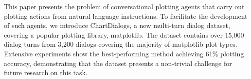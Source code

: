 This paper presents the problem of conversational plotting agents that carry out plotting actions from natural language instructions. To facilitate the development of such agents, we introduce ChartDialogs, a new multi-turn dialog dataset, covering a popular plotting library, matplotlib. The dataset contains over 15,000 dialog turns from 3,200 dialogs covering the majority of matplotlib plot types. Extensive experiments show the best-performing method achieving 61\% plotting accuracy, demonstrating that the dataset presents a non-trivial challenge for future research on this task.
